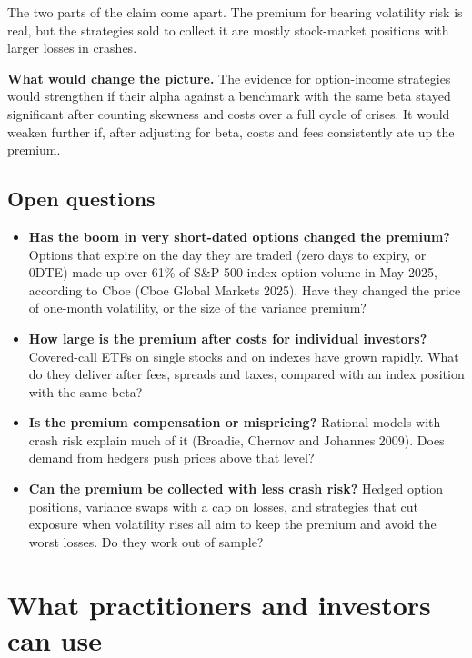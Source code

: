 The two parts of the claim come apart. The premium for bearing volatility risk is real, but the strategies sold to collect it are mostly stock-market positions with larger losses in crashes.

\textbf{What would change the picture.} The evidence for option-income strategies would strengthen if their alpha against a benchmark with the same beta stayed significant after counting skewness and costs over a full cycle of crises. It would weaken further if, after adjusting for beta, costs and fees consistently ate up the premium.

\subsection{Open questions}
\label{sec:16-open}

\begin{itemize}
  \item \textbf{Has the boom in very short-dated options changed the premium?} Options that expire on the day they are traded (zero days to expiry, or 0DTE) made up over 61\% of S\&P 500 index option volume in May 2025, according to Cboe (Cboe Global Markets 2025). Have they changed the price of one-month volatility, or the size of the variance premium?
  \item \textbf{How large is the premium after costs for individual investors?} Covered-call ETFs on single stocks and on indexes have grown rapidly. What do they deliver after fees, spreads and taxes, compared with an index position with the same beta?
  \item \textbf{Is the premium compensation or mispricing?} Rational models with crash risk explain much of it (Broadie, Chernov and Johannes 2009). Does demand from hedgers push prices above that level?
  \item \textbf{Can the premium be collected with less crash risk?} Hedged option positions, variance swaps with a cap on losses, and strategies that cut exposure when volatility rises all aim to keep the premium and avoid the worst losses. Do they work out of sample?
\end{itemize}

\section{What practitioners and investors can use}
\label{sec:16-investors}

